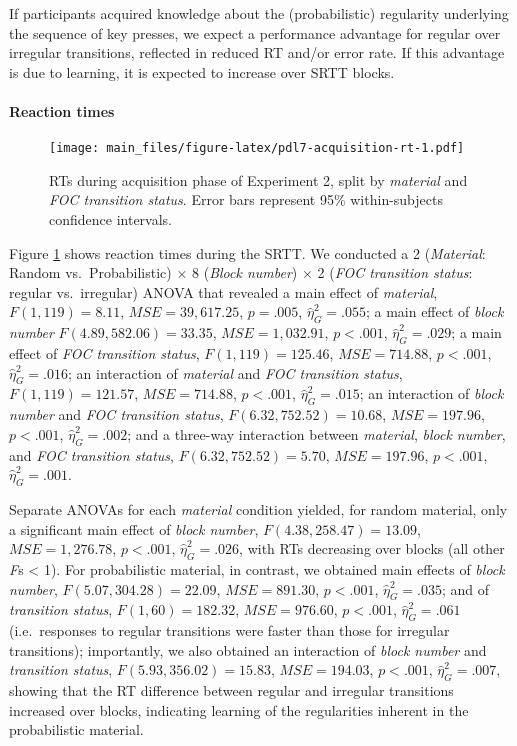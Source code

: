 \documentclass[floatsintext,doc]{apa6}
\theoremstyle{definition}
\theoremstyle{definition}
\theoremstyle{definition}
\theoremstyle{remark}
\begin{document}
If participants acquired knowledge about the (probabilistic) regularity
underlying the sequence of key presses, we expect a performance
advantage for regular over irregular transitions, reflected in reduced
RT and/or error rate. If this advantage is due to learning, it is
expected to increase over SRTT blocks.

\paragraph{Reaction times}\label{reaction-times-1}

\begin{figure}
\centering
\texttt{[image: main\_files/figure-latex/pdl7-acquisition-rt-1.pdf]}
\caption{\label{fig:pdl7-acquisition-rt}RTs during acquisition phase of
Experiment 2, split by \emph{material} and \emph{FOC transition status}.
Error bars represent 95\% within-subjects confidence intervals.}
\end{figure}

Figure \ref{fig:pdl7-acquisition-rt} shows reaction times during the
SRTT. We conducted a 2 (\emph{Material}: Random vs.~Probabilistic)
\(\times\) 8 (\emph{Block number}) \(\times\) 2 (\emph{FOC transition
status}: regular vs.~irregular) ANOVA that revealed a main effect of
\emph{material}, \(F(1, 119) = 8.11\), \(\mathit{MSE} = 39,617.25\),
\(p = .005\), \(\hat{\eta}^2_G = .055\); a main effect of \emph{block
number} \(F(4.89, 582.06) = 33.35\), \(\mathit{MSE} = 1,032.91\),
\(p < .001\), \(\hat{\eta}^2_G = .029\); a main effect of \emph{FOC
transition status}, \(F(1, 119) = 125.46\), \(\mathit{MSE} = 714.88\),
\(p < .001\), \(\hat{\eta}^2_G = .016\); an interaction of
\emph{material} and \emph{FOC transition status},
\(F(1, 119) = 121.57\), \(\mathit{MSE} = 714.88\), \(p < .001\),
\(\hat{\eta}^2_G = .015\); an interaction of \emph{block number} and
\emph{FOC transition status}, \(F(6.32, 752.52) = 10.68\),
\(\mathit{MSE} = 197.96\), \(p < .001\), \(\hat{\eta}^2_G = .002\); and
a three-way interaction between \emph{material}, \emph{block number},
and \emph{FOC transition status}, \(F(6.32, 752.52) = 5.70\),
\(\mathit{MSE} = 197.96\), \(p < .001\), \(\hat{\eta}^2_G = .001\).

Separate ANOVAs for each \emph{material} condition yielded, for random
material, only a significant main effect of \emph{block number},
\(F(4.38, 258.47) = 13.09\), \(\mathit{MSE} = 1,276.78\), \(p < .001\),
\(\hat{\eta}^2_G = .026\), with RTs decreasing over blocks (all other
\emph{F}s \textless{} 1). For probabilistic material, in contrast, we
obtained main effects of \emph{block number},
\(F(5.07, 304.28) = 22.09\), \(\mathit{MSE} = 891.30\), \(p < .001\),
\(\hat{\eta}^2_G = .035\); and of \emph{transition status},
\(F(1, 60) = 182.32\), \(\mathit{MSE} = 976.60\), \(p < .001\),
\(\hat{\eta}^2_G = .061\) (i.e.~responses to regular transitions were
faster than those for irregular transitions); importantly, we also
obtained an interaction of \emph{block number} and \emph{transition
status}, \(F(5.93, 356.02) = 15.83\), \(\mathit{MSE} = 194.03\),
\(p < .001\), \(\hat{\eta}^2_G = .007\), showing that the RT difference
between regular and irregular transitions increased over blocks,
indicating learning of the regularities inherent in the probabilistic
material.
\end{document}
